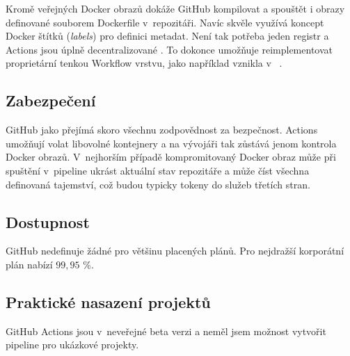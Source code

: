         Kromě veřejných Docker obrazů dokáže GitHub kompilovat a spouštět i obrazy definované souborem Dockerfile v~repozitáři. Navíc skvěle využívá koncept Docker štítků (\textit{labels}) pro definici metadat. Není tak potřeba jeden registr a Actions jsou úplně decentralizované \cite{ga-labels}. To dokonce umožňuje reimplementovat proprietární tenkou Workflow vrstvu, jako například vznikla v~ \cite{nektos-act}.

    \subsection{Zabezpečení}
        GitHub jako  přejímá skoro všechnu zodpovědnost za bezpečnost. Actions umožňují volat libovolné kontejnery a na vývojáři tak zůstává jenom kontrola Docker obrazů. V~nejhorším případě kompromitovaný Docker obraz může při spuštění v~pipeline ukrást aktuální stav repozitáře a může číst všechna definovaná tajemství, což budou typicky tokeny do služeb třetích stran.

    \subsection{Dostupnost}
        GitHub nedefinuje žádné  pro většinu placených plánů. Pro nejdražší korporátní plán nabízí  $99,95$ \%.

    \subsection{Praktické nasazení projektů}
        GitHub Actions jsou v~neveřejné beta verzi a neměl jsem možnost vytvořit pipeline pro ukázkové projekty.
